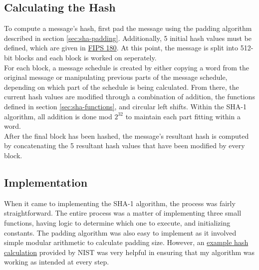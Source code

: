 	\subsection{Calculating the Hash}\label{sec:sha-hash}
		To compute a message's hash, first pad the message using the padding algorithm described in section \ref{sec:sha-padding}. Additionally, 5 initial hash values must be defined, which are given
		in \href{https://nvlpubs.nist.gov/nistpubs/FIPS/NIST.FIPS.180-4.pdf}{FIPS 180}. At this point, the message is split into 512-bit blocks and each block is worked on seperately.\\

		For each block, a message schedule is created by either copying a word from the original message or manipulating previous parts of the message schedule, depending on which part of the
		schedule is being calculated. From there, the current hash values are modified through a combination of addition, the functions defined in section \ref{sec:sha-functions}, and circular
		left shifts. Within the SHA-1 algorithm, all addition is done mod $2^{32}$ to maintain each part fitting within a word.\\

		After the final block has been hashed, the message's resultant hash is computed by concatenating the 5 resultant hash values that have been modified by every block.

	\subsection{Implementation}\label{sec:sha-implementation}
		When it came to implementing the SHA-1 algorithm, the process was fairly straightforward. The entire process was a matter of implementing three small functions, having
		logic to determine which one to execute, and initializing constants. The padding algorithm was also easy to implement as it involved simple modular arithmetic to calculate padding size.
		However, an \href{https://csrc.nist.gov/CSRC/media/Projects/Cryptographic-Standards-and-Guidelines/documents/examples/SHA1.pdf}{example hash calculation} provided by NIST was very
		helpful in ensuring that my algorithm was working as intended at every step.
